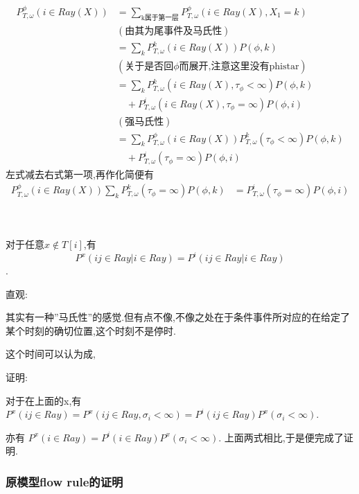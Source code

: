\documentclass[a4paper,oneside]{ctexbook}
\begin{document}
		 \begin{pf}
		 	\label{r17lem4.3}
		 	\begin{align*}
				P^{\phi}_{T,\omega}(i\in Ray(X)) 
				&= \sum_{\mbox{k属于第一层}}  P^{\phi}_{T,\omega}(i\in Ray(X), X_1=k) \\
				&(\mbox{由其为尾事件及马氏性}) \\
					&= \sum_{k}  P^{k}_{T,\omega}(i\in Ray(X))P(\phi,k) \\
				&(\mbox{关于是否回$\phi$而展开,注意这里没有phistar}) \\
					&= \sum_{k}  P^{k}_{T,\omega}(i\in Ray(X),\tau_{\phi} < \infty)P(\phi,k)\\
					&\quad  + P^{i}_{T,\omega}(i\in Ray(X),\tau_{\phi} = \infty)P(\phi,i) \\
				&(\mbox{强马氏性}) \\
					&= \sum_{k}  P^{\phi}_{T,\omega}(i\in Ray(X)) P^{k}_{T,\omega}(\tau_{\phi} < \infty)P(\phi,k) \\
					&\quad  + P^{i}_{T,\omega}(\tau_{\phi} = \infty)P(\phi,i)
			\end{align*}
			左式减去右式第一项,再作化简便有
			\begin{align*}
				P^{\phi}_{T,\omega}(i\in Ray(X)) \sum_{k} P^{k}_{T,\omega}(\tau_{\phi} = \infty)P(\phi,k) 
					&= P^{i}_{T,\omega}(\tau_{\phi} = \infty)P(\phi,i) \\
			\end{align*}
		 \end{pf}


		 \begin{pro}[起点无关]
		 	\ 

		 	对于任意$x\notin T[i]$,有$$P^x(ij \in Ray | i \in Ray) = P^i(ij \in Ray | i \in Ray)$$.

			直观:

				其实有一种”马氏性”的感觉.但有点不像,不像之处在于条件事件所对应的在给定了某个时刻的确切位置,这个时刻不是停时.

				这个时间可以认为成,

			证明:

				对于在上面的x,有$P^x(ij \in Ray) = P^x(ij \in Ray, \sigma_i < \infty) = P^i(ij \in Ray) P^x(\sigma_i < \infty)$.

			亦有 $P^x(i \in Ray) = P^i(i \in Ray) P^x(\sigma_i < \infty)$. 上面两式相比,于是便完成了证明.

		 \end{pro}

		\subsubsection*{原模型flow rule的证明}
\end{document}
